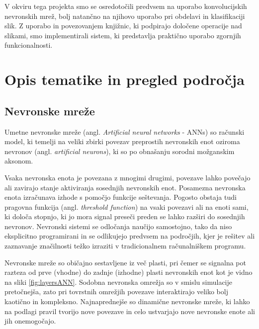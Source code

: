 \documentclass[runningheads,a4paper]{llncs}
\begin{document}
V okviru tega projekta smo se osredotočili predvsem na uporabo konvolucijskih nevronskih mrež, bolj natančno na njihovo uporabo pri obdelavi in klasifikaciji slik. Z uporabo in povezovanjem knjižnic, ki podpirajo določene operacije nad slikami, smo implementirali sistem, ki predstavlja praktično uporabo zgornjih funkcionalnosti.

\raggedbottom
\section{Opis tematike in pregled področja}

\subsection{Nevronske mreže}
Umetne nevronske mreže (angl. \textit{Artificial neural networks} - ANNs) so računski model, ki temelji na veliki zbirki povezav preprostih nevronskih enot oziroma nevronov (angl. \textit{artificial neurons}), ki so po obnašanju sorodni možganskim aksonom\cite{wiki:ANN}. 

Vsaka nevronska enota je povezana z mnogimi drugimi, povezave lahko povečajo ali zavirajo stanje aktiviranja sosednjih nevronskih enot. Posamezna nevronska enota izračunava izhode s pomočjo funkcije seštevanja. Pogosto obstaja tudi pragovna funkcija (angl. \textit{threshold function}) na vsaki povezavi ali na enoti sami, ki določa stopnjo, ki jo mora signal preseči preden se lahko razširi do sosednjih nevronov. Nevronski sistemi se odločanja naučijo samostojno, tako da niso eksplicitno programirani in se odlikujejo predvsem na področjih, kjer je rešitev ali zaznavanje značilnosti težko izraziti v tradicionalnem računalniškem programu.

Nevronske mreže so običajno sestavljene iz več plasti, pri čemer se signalna pot razteza od prve (vhodne) do zadnje (izhodne) plasti nevronskih enot kot je vidno na sliki \ref{fig:layersANN}. Sodobna nevronska omrežja so v smislu simulacije pretočnejša, zato pri tovrstnih omrežjih povezave interaktirajo veliko bolj kaotično in kompleksno. Najnaprednejše so dinamične nevronske mreže, ki lahko na podlagi pravil tvorijo nove povezave in celo ustvarjajo nove nevronske enote ali jih onemogočajo.
\end{document}
